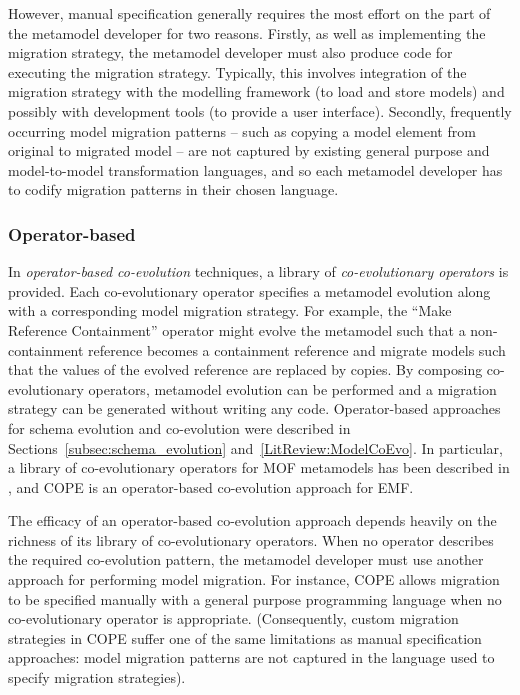 However, manual specification generally requires the most effort on the part of the metamodel developer for two reasons. Firstly, as well as implementing the migration strategy, the metamodel developer must also produce code for executing the migration strategy. Typically, this involves integration of the migration strategy with the modelling framework (to load and store models) and possibly with development tools (to provide a user interface). Secondly, frequently occurring model migration patterns -- such as copying a model element from original to migrated model -- are not captured by existing general purpose and model-to-model transformation languages, and so each metamodel developer has to codify migration patterns in their chosen language.

\subsubsection{Operator-based}
\label{subsec:operator-based_co-evolution}
In \emph{operator-based co-evolution} techniques, a library of \emph{co-evolutionary operators} is provided. Each co-evolutionary operator specifies a metamodel evolution along with a corresponding model migration strategy. For example, the ``Make Reference Containment'' operator might evolve the metamodel such that a non-containment reference becomes a containment reference and migrate models such that the values of the evolved reference are replaced by copies. By composing co-evolutionary operators, metamodel evolution can be performed and a migration strategy can be generated without writing any code. Operator-based approaches for schema evolution and co-evolution were described in Sections~\ref{subsec:schema_evolution} and~\ref{LitReview:ModelCoEvo}. In particular, a library of co-evolutionary operators for MOF metamodels has been described in \cite{wachsmuth07metamodel}, and COPE \cite{herrmannsdoerfer09cope} is an operator-based co-evolution approach for EMF.

The efficacy of an operator-based co-evolution approach depends heavily on the richness of its library of co-evolutionary operators. When no operator describes the required co-evolution pattern, the metamodel developer must use another approach for performing model migration. For instance, COPE allows migration to be specified manually with a general purpose programming language when no co-evolutionary operator is appropriate. (Consequently, custom migration strategies in COPE suffer one of the same limitations as manual specification approaches: model migration patterns are not captured in the language used to specify migration strategies).

